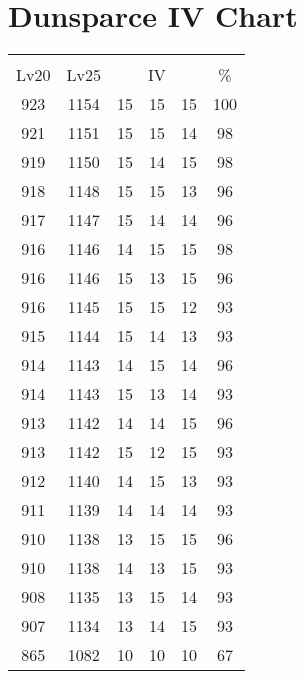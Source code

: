 \documentclass{article}%
\begin{document}
%
\normalsize%
\section{Dunsparce IV Chart}%
\label{sec:Dunsparce IV Chart}%
\renewcommand{\arraystretch}{1.5}%
\begin{tabular}{|c|c|c|c|c|c|}%
\hline%
\multicolumn{6}{|c|}{\textcolor{white}{ 
\linebreak{Dunsparce}
}%
\cellcolor{black}}\\%
\multicolumn{1}{|c}{Lv20}&\multicolumn{1}{c|}{Lv25}&\multicolumn{3}{c|}{IV}&\multicolumn{1}{|c|}{\%}\\%
\hline%
\rowcolor{color100}%
923&1154&15&15&15&100\\%
\hline%
\rowcolor{color98}%
921&1151&15&15&14&98\\%
\hline%
\rowcolor{color98}%
919&1150&15&14&15&98\\%
\hline%
\rowcolor{color96}%
918&1148&15&15&13&96\\%
\hline%
\rowcolor{color96}%
917&1147&15&14&14&96\\%
\hline%
\rowcolor{color98}%
916&1146&14&15&15&98\\%
\hline%
\rowcolor{color96}%
916&1146&15&13&15&96\\%
\hline%
\rowcolor{color93}%
916&1145&15&15&12&93\\%
\hline%
\rowcolor{color93}%
915&1144&15&14&13&93\\%
\hline%
\rowcolor{color96}%
914&1143&14&15&14&96\\%
\hline%
\rowcolor{color93}%
914&1143&15&13&14&93\\%
\hline%
\rowcolor{color96}%
913&1142&14&14&15&96\\%
\hline%
\rowcolor{color93}%
913&1142&15&12&15&93\\%
\hline%
\rowcolor{color93}%
912&1140&14&15&13&93\\%
\hline%
\rowcolor{color93}%
911&1139&14&14&14&93\\%
\hline%
\rowcolor{color96}%
910&1138&13&15&15&96\\%
\hline%
\rowcolor{color93}%
910&1138&14&13&15&93\\%
\hline%
\rowcolor{color93}%
908&1135&13&15&14&93\\%
\hline%
\rowcolor{color93}%
907&1134&13&14&15&93\\%
\hline%
\rowcolor{color91}%
865&1082&10&10&10&67\\%
\end{tabular}

%
\end{document}
